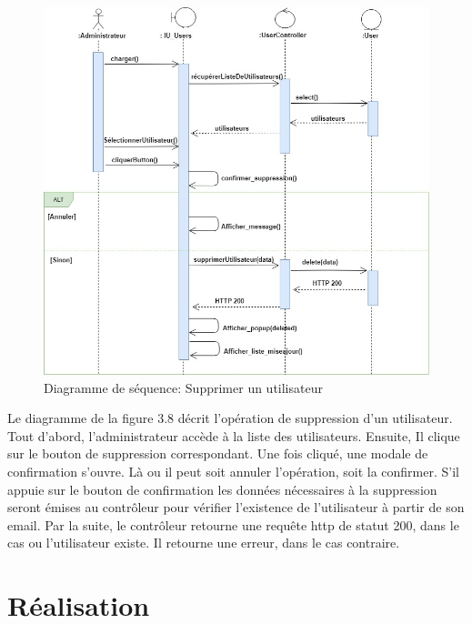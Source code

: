 \begin{figure}[H]
	\centering
	\includegraphics[scale=0.55]{deleteuser.jpg}
	\caption{Diagramme de séquence: Supprimer un utilisateur}
	\label{Diagramme de séquence: Supprimer un utilisateur}
\end{figure}
Le diagramme de la figure 3.8 décrit l'opération de suppression d'un utilisateur. Tout d'abord, l'administrateur accède à la liste des utilisateurs. Ensuite, 
Il clique sur le bouton de suppression correspondant. Une fois cliqué, une modale de confirmation s'ouvre. Là ou il peut soit annuler l'opération, soit la confirmer. S'il appuie sur le bouton de confirmation  les données nécessaires à la suppression seront émises au contrôleur pour 
vérifier l'existence de l'utilisateur à partir de son email. Par la suite, le contrôleur retourne une requête http de statut 200, dans le cas ou l'utilisateur existe. Il retourne une erreur, dans le cas contraire.


\section{Réalisation}
